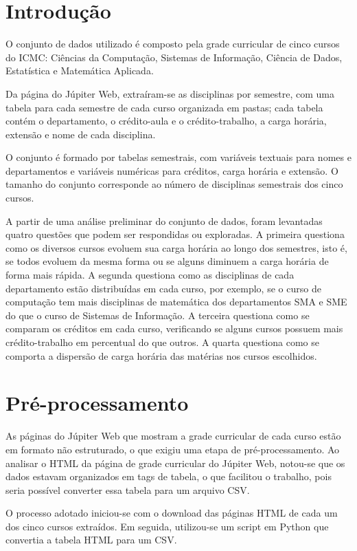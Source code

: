 \documentclass[12pt]{article}
\begin{document}
\section{Introdução}

O conjunto de dados utilizado é composto pela grade curricular de cinco cursos
do ICMC: Ciências da Computação, Sistemas de Informação, Ciência de Dados,
Estatística e Matemática Aplicada.

Da página do Júpiter Web, extraíram-se as disciplinas por semestre, com uma
tabela para cada semestre de cada curso organizada em pastas; cada tabela
contém o departamento, o crédito-aula e o crédito-trabalho, a carga horária,
extensão e nome de cada disciplina.

O conjunto é formado por tabelas semestrais, com variáveis textuais para nomes
e departamentos e variáveis numéricas para créditos, carga horária e extensão.
O tamanho do conjunto corresponde ao número de disciplinas semestrais dos cinco
cursos.

A partir de uma análise preliminar do conjunto de dados, foram levantadas
quatro questões que podem ser respondidas ou exploradas. A primeira questiona
como os diversos cursos evoluem sua carga horária ao longo dos semestres, isto
é, se todos evoluem da mesma forma ou se alguns diminuem a carga horária de
forma mais rápida. A segunda questiona como as disciplinas de cada departamento
estão distribuídas em cada curso, por exemplo, se o curso de computação tem
mais disciplinas de matemática dos departamentos SMA e SME do que o curso de
Sistemas de Informação. A terceira questiona como se comparam os créditos em
cada curso, verificando se alguns cursos possuem mais crédito-trabalho em
percentual do que outros. A quarta questiona como se comporta a dispersão de
carga horária das matérias nos cursos escolhidos.

\section{Pré-processamento}

As páginas do Júpiter Web que mostram a grade curricular de cada curso estão em
formato não estruturado, o que exigiu uma etapa de pré-processamento. Ao
analisar o HTML da página de grade curricular do Júpiter Web, notou-se que os
dados estavam organizados em tags de tabela, o que facilitou o trabalho, pois
seria possível converter essa tabela para um arquivo CSV.

O processo adotado iniciou-se com o download das páginas HTML de cada um dos
cinco cursos extraídos. Em seguida, utilizou-se um script em Python que
convertia a tabela HTML para um CSV.
\end{document}
